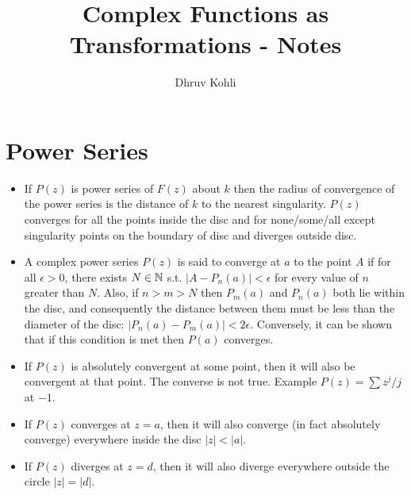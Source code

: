 \documentclass[12pt]{article}
\def\mb{\ensuremath\mathbb}
\def\N{\ensuremath\mb{N}}
\begin{document}
    
\title{Complex Functions as Transformations - Notes}
\author{Dhruv Kohli}
\maketitle
\section{Power Series}
\begin{itemize}
    \item If $P(z)$ is power series of $F(z)$ about $k$ then the radius of convergence of the power series is the distance of $k$ to the nearest singularity. $P(z)$ converges for all the points inside the disc and for none/some/all except singularity points on the boundary of disc and diverges outside disc.
    \item A complex power series $P(z)$ is said to converge at $a$ to the point $A$ if for all $\epsilon > 0$, there exists $N \in \N$ s.t. $|A-P_n(a)|<\epsilon$ for every value of $n$ greater than $N$. Also, if $n>m>N$ then $P_{m}(a)$ and $P_{n}(a)$ both lie within the disc, and consequently the distance between them must be less than the diameter of the disc: $|P_{n}(a)-P_{m}(a)| < 2\epsilon$. Conversely, it can be shown that if this condition is met then $P(a)$ converges.
    \item If $P(z)$ is absolutely convergent at some point, then it will also be convergent at that point. The converse is not true. Example $P(z)=\sum z^j/j$ at $-1$.
    \item If $P(z)$ converges at $z=a$, then it will also converge (in fact absolutely converge) everywhere inside the disc $|z|<|a|$.
    \item If $P(z)$ diverges at $z=d$, then it will also diverge everywhere outside the circle $|z|=|d|$.
\end{itemize}
\end{document}
